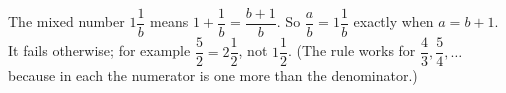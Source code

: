 The mixed number $1\dfrac{1}{b}$ means $1+\dfrac{1}{b}=\dfrac{b+1}{b}$. So $\dfrac {a}{b}=1\dfrac{1}{b}$ exactly when $a=b+1$. It fails otherwise; for example $\dfrac{5}{2}=2\dfrac{1}{2}$, not $1\dfrac{1}{2}$. (The rule works for $\dfrac{4}{3},\dfrac{5}{4},\dots$ because in each the numerator is one more than the denominator.)
